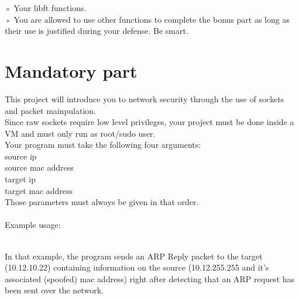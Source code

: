 \documentclass{42-en}
\begin{document}
            ◦ Your libft functions.\\    

            ◦ You are allowed to use other functions to complete the bonus part as long as their use is justified during your defense. Be smart.

\chapter{Mandatory part}

    This project will introduce you to network security through the use of sockets and packet mainpulation.\\
    Since raw sockets require low level privileges, your project must be done inside a VM and must only run as root/sudo user.\\

    Your program must take the following four arguments:\\
      source ip\\
      source mac address\\
      target ip\\
      target mac address\\

      Those parameters must always be given in that order.\\
    \\
        Example usage:
    \\
    In that example, the program sends an ARP Reply packet to the target (10.12.10.22) containing information on the source (10.12.255.255 and it's associated (spoofed) mac address)
    right after detecting that an ARP request has been sent over the network.\\
\end{document}
